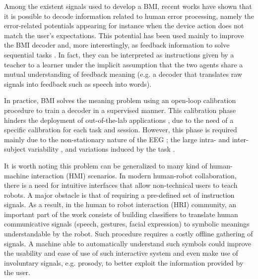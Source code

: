 \documentclass[conference]{IEEEtran}
\begin{document}
%
Among the existent signals used to develop a BMI, recent works have shown that it is possible to decode information related to human error processing, namely the error-related potentials \cite{FerrezErrores} appearing for instance when the device action does not match the user's expectations. This potential has been used mainly to improve the BMI decoder \cite{Blumberg2007} and, more interestingly, as feedback information to solve sequential tasks \cite{chavarriaga2010learning, iturrate2010robot}. 
%
In fact, they can be interpreted as instructions given by a teacher to a learner under the implicit assumption that the two agents share a mutual understanding of feedback meaning (e.g. a decoder that translates raw signals into feedback such as speech into words).

In practice, BMI solves the meaning problem using an open-loop calibration procedure to train a decoder in a supervised manner. This calibration phase hinders the deployment of out-of-the-lab applications \cite{millan10}, due to the need of a specific calibration for each task and session. However, this phase is required mainly due to the non-stationary nature of the EEG \cite{vidaurre11}; the large intra- and inter-subject variability \cite{Polich1997}, and variations induced by the task \cite{IturrateErrP13}. 

It is worth noting this problem can be generalized to many kind of human-machine interaction (HMI) scenarios. In modern human-robot collaboration, there is a need for intuitive interfaces that allow non-technical users to teach robots. A major obstacle is that of requiring a pre-defined set of instruction signals. As a result, in the human to robot interaction (HRI) community, an important part of the work consists of building classifiers to translate human communicative signals (speech, gestures, facial expression) to symbolic meanings understandable by the robot. Such procedure requires a costly offline gathering of signals. A machine able to automatically understand such symbols could improve the usability and ease of use of such interactive system and even make use of involuntary signals, e.g. prosody, to better exploit the information provided by the user. 
\end{document}
